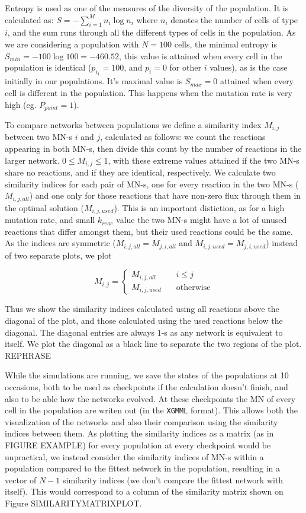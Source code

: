 \documentclass[10pt,a4paper]{article}
\begin{document}
Entropy is used as one of the measures of the diversity of the population. It is calculated as: $S=- \sum^{M}_{i=1} n_i \log n_i $ where $n_i$ denotes the number of cells of type $i$, and the sum runs through all the different types of cells in the population.  As we are considering a population with $N=100$ cells, the minimal entropy is $S_{min}=-100\log100=-460.52$, this value is attained when every cell in the population is identical ($p_{i_1}=100$, and $p_i=0$ for other $i$ values), as is the case initially in our populations. It's maximal value is $S_{max}=0$ attained when every cell is different in the population. This happens when the mutation rate is very high (eg. $P_{point}=1$). 


To compare networks between populations we define a similarity index $M_{i,j}$ between two MN-s $i$ and $j$, calculated as follows: we count the reactions appearing in both MN-s, then divide this count by the number of reactions in the larger network. $0\leq M_{i,j} \leq 1$, with these extreme values attained if the two MN-s share no reactions, and if they are identical, respectively. We calculate two similarity indices for each pair of MN-s, one for every reaction in the two MN-s ($M_{i,j,all}$) and one only for those reactions that have non-zero flux through them in the optimal solution ($M_{i,j,used}$). This is an important distiction, as for a high mutation rate, and small $k_{reac}$ value the two MN-s might have a lot of unused reactions that differ amongst them, but their used reactions could be the same.  As the indices are symmetric ($M_{i,j,all}=M_{j,i,all}$ and  $M_{i,j,used}=M_{j,i,used}$) instead of two separate plots, we plot 

$$
M_{i,j}= \left\{
	\begin{array}{ll}
		M_{i,j,all} & \quad i \leq j \\
		M_{i,j,used} & \quad \text{otherwise}
	\end{array}
\right.
$$

Thus we show the similarity indices calculated using all reactions above the diagonal of the plot, and those calculated using the used reactions below the diagonal. The diagonal entries are always $1$-s as any network is equivalent to itself. We plot the diagonal as a black line to separate the two regions of the plot. REPHRASE

While the simulations are running, we save the states of the populations at 10 occasions, both to be used as checkpoints if the calculation doesn't finish, and also to be able how the networks evolved. At these checkpoints the MN of every cell in the population are writen out (in the \texttt{XGMML} format). This allows both the visualization of the networks and also their comparison using the similarity indices between them. As plotting the similarity indices as a matrix (as in FIGURE EXAMPLE) for every population at every checkpoint would be unpractical, we instead consider the similarity indices of MN-s within a population compared to the fittest network in the population, resulting in a vector of $N-1$ similarity indices (we don't compare the fittest network with itself). This would correspond to a column of the similarity matrix shown on Figure SIMILARITYMATRIXPLOT.
\end{document}
